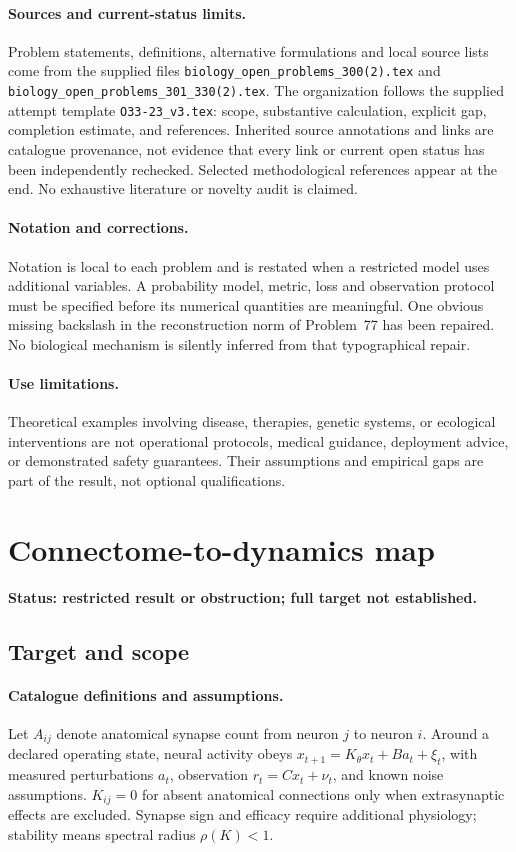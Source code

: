 \documentclass[11pt]{article}
\begin{document}
\paragraph{Sources and current-status limits.}
Problem statements, definitions, alternative formulations and local source lists
come from the supplied files
\texttt{biology\_open\_problems\_300(2).tex} and
\texttt{biology\_open\_problems\_301\_330(2).tex}.
The organization follows the supplied attempt template
\texttt{O33-23\_v3.tex}: scope, substantive calculation, explicit gap,
completion estimate, and references. Inherited source annotations and links are
catalogue provenance, not evidence that every link or current open status has
been independently rechecked. Selected methodological references appear at the
end. No exhaustive literature or novelty audit is claimed.

\paragraph{Notation and corrections.}
Notation is local to each problem and is restated when a restricted model uses
additional variables. A probability model, metric, loss and observation protocol
must be specified before its numerical quantities are meaningful. One obvious
missing backslash in the reconstruction norm of Problem~77 has been repaired.
No biological mechanism is silently inferred from that typographical repair.

\paragraph{Use limitations.}
Theoretical examples involving disease, therapies, genetic systems, or ecological
interventions are not operational protocols, medical guidance, deployment advice,
or demonstrated safety guarantees. Their assumptions and empirical gaps are part
of the result, not optional qualifications.


\section*{Connectome-to-dynamics map}
\label{prob:110}
\noindent\textbf{Status: restricted result or obstruction; full target not established.}
\subsection{Target and scope}
\paragraph{Catalogue definitions and assumptions.}
Let $A_{ij}$ denote anatomical synapse count from neuron $j$ to neuron $i$. Around a declared operating state, neural activity obeys $x_{t+1}=K_\theta x_t+B a_t+\xi_t$, with measured perturbations $a_t$, observation $r_t=Cx_t+\nu_t$, and known noise assumptions. $K_{ij}=0$ for absent anatomical connections only when extrasynaptic effects are excluded. Synapse sign and efficacy require additional physiology; stability means spectral radius $\rho(K)<1$.
\end{document}
